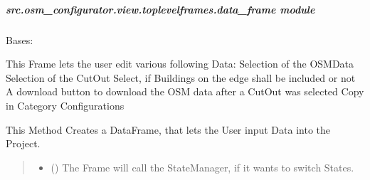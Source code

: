 \documentclass[letterpaper,10pt,english]{sphinxmanual}
\begin{document}
\subparagraph{src.osm\_configurator.view.toplevelframes.data\_frame module}
\label{\detokenize{apidoc/src.osm_configurator.view.toplevelframes:module-src.osm_configurator.view.toplevelframes.data_frame}}\label{\detokenize{apidoc/src.osm_configurator.view.toplevelframes:src-osm-configurator-view-toplevelframes-data-frame-module}}

\begin{fulllineitems}
\label{\detokenize{apidoc/src.osm_configurator.view.toplevelframes:src.osm_configurator.view.toplevelframes.data_frame.DataFrame}}
\pysigstartsignatures
{}
\pysigstopsignatures
\sphinxAtStartPar
Bases: {\hyperref[\detokenize{apidoc/src.osm_configurator.view.toplevelframes:src.osm_configurator.view.toplevelframes.top_level_frame.TopLevelFrame}]{}}

\sphinxAtStartPar
This Frame lets the user edit various following Data:
\sphinxhyphen{} Selection of the OSM\sphinxhyphen{}Data
\sphinxhyphen{} Selection of the Cut\sphinxhyphen{}Out
\sphinxhyphen{} Select, if Buildings on the edge shall be included or not
\sphinxhyphen{} A download button to download the OSM data after a Cut\sphinxhyphen{}Out was selected
\sphinxhyphen{} Copy in Category Configurations

\begin{fulllineitems}
\label{\detokenize{apidoc/src.osm_configurator.view.toplevelframes:src.osm_configurator.view.toplevelframes.data_frame.DataFrame.__init__}}
\pysigstartsignatures
{}
\pysigstopsignatures
\sphinxAtStartPar
This Method Creates a DataFrame, that lets the User input Data into the Project.
\begin{quote}\begin{description}
\begin{itemize}
\item {} 
\sphinxAtStartPar
{} ({\hyperref[\detokenize{apidoc/src.osm_configurator.view.states:src.osm_configurator.view.states.state_manager.StateManager}]{}}) \textendash{} The Frame will call the StateManager, if it wants to switch States.


\end{itemize}
\end{description}
\end{quote}
\end{fulllineitems}
\end{fulllineitems}
\end{document}
